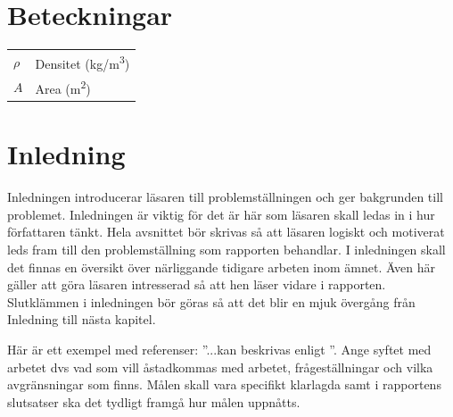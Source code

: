 \documentclass[a4paper]{article}
\begin{document}
\newpage
\section*{Beteckningar}
\begin{table}[h]
\begin{tabular}{l l}
$\rho$ & Densitet (\si{kg/m^3}) \\
$A$ & Area (\si{m^2})
\end{tabular}
\end{table}


\newpage
{} 
\setcounter{page}{1}
\section{Inledning}
Inledningen introducerar läsaren till problemställningen och ger bakgrunden till problemet. Inledningen är viktig för det är här som läsaren skall ledas in i hur författaren tänkt. Hela avsnittet bör skrivas så att läsaren logiskt och motiverat leds fram till den problemställning som rapporten behandlar. I inledningen skall det finnas en översikt över närliggande tidigare arbeten inom ämnet. Även här gäller att göra läsaren intresserad så att hen läser vidare i rapporten. Slutklämmen i inledningen bör göras så att det blir en mjuk övergång från Inledning till nästa kapitel.

Här är ett exempel med referenser: ''...kan beskrivas enligt \cite{Sterte2001}''.
Ange syftet med arbetet dvs vad som vill åstadkommas med arbetet, frågeställningar och vilka avgränsningar som finns. Målen skall vara specifikt klarlagda samt i rapportens slutsatser ska det tydligt framgå hur målen uppnåtts.

%
%
\end{document}

